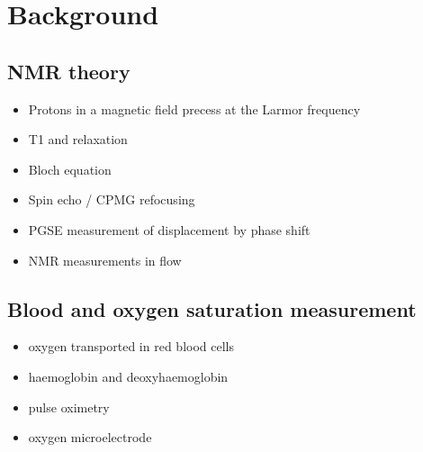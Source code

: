 \chapter{Background}\label{ch:background}

\section{NMR theory}
\begin{itemize}
\item Protons in a magnetic field precess at the Larmor frequency
\item T1 and \Ttwo relaxation
\item Bloch equation
\item Spin echo / CPMG refocusing
\item PGSE measurement of displacement by phase shift
\item NMR measurements in flow
\end{itemize}

\section{Blood and oxygen saturation measurement}
\begin{itemize}
\item oxygen transported in red blood cells
\item haemoglobin and deoxyhaemoglobin
\item pulse oximetry
\item oxygen microelectrode
\end{itemize}
